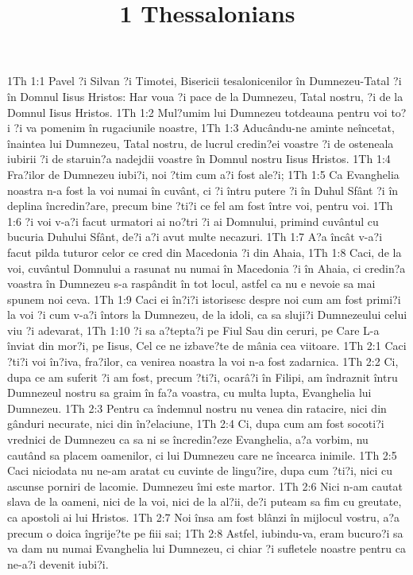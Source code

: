 

\title{1 Thessalonians}

1Th 1:1  Pavel ?i Silvan ?i Timotei, Bisericii tesalonicenilor în Dumnezeu-Tatal ?i în Domnul Iisus Hristos: Har voua ?i pace de la Dumnezeu, Tatal nostru, ?i de la Domnul Iisus Hristos.
1Th 1:2  Mul?umim lui Dumnezeu totdeauna pentru voi to?i ?i va pomenim în rugaciunile noastre,
1Th 1:3  Aducându-ne aminte neîncetat, înaintea lui Dumnezeu, Tatal nostru, de lucrul credin?ei voastre ?i de osteneala iubirii ?i de staruin?a nadejdii voastre în Domnul nostru Iisus Hristos.
1Th 1:4  Fra?ilor de Dumnezeu iubi?i, noi ?tim cum a?i fost ale?i;
1Th 1:5  Ca Evanghelia noastra n-a fost la voi numai în cuvânt, ci ?i întru putere ?i în Duhul Sfânt ?i în deplina încredin?are, precum bine ?ti?i ce fel am fost între voi, pentru voi.
1Th 1:6  ?i voi v-a?i facut urmatori ai no?tri ?i ai Domnului, primind cuvântul cu bucuria Duhului Sfânt, de?i a?i avut multe necazuri.
1Th 1:7  A?a încât v-a?i facut pilda tuturor celor ce cred din Macedonia ?i din Ahaia,
1Th 1:8  Caci, de la voi, cuvântul Domnului a rasunat nu numai în Macedonia ?i în Ahaia, ci credin?a voastra în Dumnezeu s-a raspândit în tot locul, astfel ca nu e nevoie sa mai spunem noi ceva.
1Th 1:9  Caci ei în?i?i istorisesc despre noi cum am fost primi?i la voi ?i cum v-a?i întors la Dumnezeu, de la idoli, ca sa sluji?i Dumnezeului celui viu ?i adevarat,
1Th 1:10  ?i sa a?tepta?i pe Fiul Sau din ceruri, pe Care L-a înviat din mor?i, pe Iisus, Cel ce ne izbave?te de mânia cea viitoare.
1Th 2:1  Caci ?ti?i voi în?iva, fra?ilor, ca venirea noastra la voi n-a fost zadarnica.
1Th 2:2  Ci, dupa ce am suferit ?i am fost, precum ?ti?i, ocarâ?i în Filipi, am îndraznit întru Dumnezeul nostru sa graim în fa?a voastra, cu multa lupta, Evanghelia lui Dumnezeu.
1Th 2:3  Pentru ca îndemnul nostru nu venea din ratacire, nici din gânduri necurate, nici din în?elaciune,
1Th 2:4  Ci, dupa cum am fost socoti?i vrednici de Dumnezeu ca sa ni se încredin?eze Evanghelia, a?a vorbim, nu cautând sa placem oamenilor, ci lui Dumnezeu care ne încearca inimile.
1Th 2:5  Caci niciodata nu ne-am aratat cu cuvinte de lingu?ire, dupa cum ?ti?i, nici cu ascunse porniri de lacomie. Dumnezeu îmi este martor.
1Th 2:6  Nici n-am cautat slava de la oameni, nici de la voi, nici de la al?ii, de?i puteam sa fim cu greutate, ca apostoli ai lui Hristos.
1Th 2:7  Noi însa am fost blânzi în mijlocul vostru, a?a precum o doica îngrije?te pe fiii sai;
1Th 2:8  Astfel, iubindu-va, eram bucuro?i sa va dam nu numai Evanghelia lui Dumnezeu, ci chiar ?i sufletele noastre pentru ca ne-a?i devenit iubi?i.
